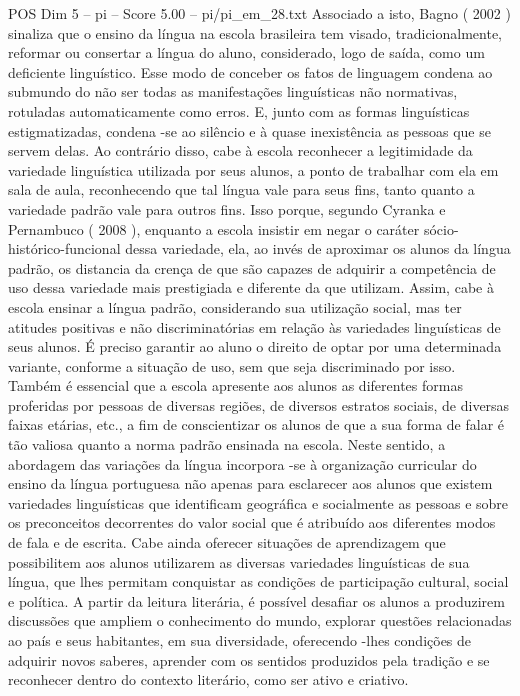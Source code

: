 \begin{textsample}{POS Dim 5 – pi – Score 5.00 – pi/pi\_em\_28.txt}
Associado a isto, Bagno ( 2002 ) sinaliza que o ensino da língua na escola brasileira tem visado, tradicionalmente, reformar ou consertar a língua do aluno, considerado, logo de saída, como um deficiente linguístico.
Esse modo de conceber os fatos de linguagem condena ao submundo do não ser todas as manifestações linguísticas não normativas, rotuladas automaticamente como erros.
E, junto com as formas linguísticas estigmatizadas, condena -se ao silêncio e à quase inexistência as pessoas que se servem delas.
Ao contrário disso, cabe à escola reconhecer a legitimidade da variedade linguística utilizada por seus alunos, a ponto de trabalhar com ela em sala de aula, reconhecendo que tal língua vale para seus fins, tanto quanto a variedade padrão vale para outros fins.
Isso porque, segundo Cyranka e Pernambuco ( 2008 ), enquanto a escola insistir em negar o caráter sócio-histórico-funcional dessa variedade, ela, ao invés de aproximar os alunos da língua padrão, os distancia da crença de que são capazes de adquirir a competência de uso dessa variedade mais prestigiada e diferente da que utilizam.
Assim, cabe à escola ensinar a língua padrão, considerando sua utilização social, mas ter atitudes positivas e não discriminatórias em relação às variedades linguísticas de seus alunos.
É preciso garantir ao aluno o direito de optar por uma determinada variante, conforme a situação de uso, sem que seja discriminado por isso.
Também é essencial que a escola apresente aos alunos as diferentes formas proferidas por pessoas de diversas regiões, de diversos estratos sociais, de diversas faixas etárias, etc., a fim de conscientizar os alunos de que a sua forma de falar é tão valiosa quanto a norma padrão ensinada na escola.
Neste sentido, a abordagem das variações da língua incorpora -se à organização curricular do ensino da língua portuguesa não apenas para esclarecer aos alunos que existem variedades linguísticas que identificam geográfica e socialmente as pessoas e sobre os preconceitos decorrentes do valor social que é atribuído aos diferentes modos de fala e de escrita.
Cabe ainda oferecer situações de aprendizagem que possibilitem aos alunos utilizarem as diversas variedades linguísticas de sua língua, que lhes permitam conquistar as condições de participação cultural, social e política.
A partir da leitura literária, é possível desafiar os alunos a produzirem discussões que ampliem o conhecimento do mundo, explorar questões relacionadas ao país e seus habitantes, em sua diversidade, oferecendo -lhes condições de adquirir novos saberes, aprender com os sentidos produzidos pela tradição e se reconhecer dentro do contexto literário, como ser ativo e criativo.

\end{textsample}
